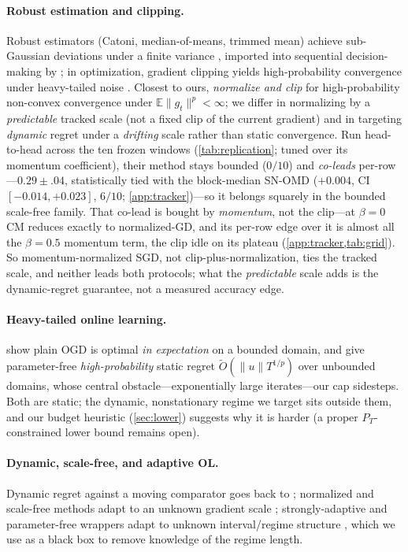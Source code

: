\documentclass{article}
\newcommand{\norm}[1]{\lVert #1 \rVert}
\newcommand{\gt}{g_t}
\begin{document}
\paragraph{Robust estimation and clipping.} Robust estimators (Catoni, median-of-means,
trimmed mean) achieve sub-Gaussian deviations under a finite variance
\citep{catoni2012,devroye2016,lugosi2019}, imported into sequential decision-making by
\citet{bubeck2013}; in optimization, gradient clipping yields high-probability convergence
under heavy-tailed noise \citep{zhang2020clip,gorbunov2020,nguyen2023}. Closest to ours,
\citet{cutkoskymehta2021} \emph{normalize and clip} for high-probability non-convex
convergence under $\mathbb{E}\norm{\gt}^p\!<\!\infty$; we differ in normalizing by a
\emph{predictable} tracked scale (not a fixed clip of the current gradient) and in targeting
\emph{dynamic} regret under a \emph{drifting} scale rather than static convergence. Run
head-to-head across the ten frozen windows (\cref{tab:replication}; tuned over its momentum
coefficient), their method stays bounded ($0/10$) and \emph{co-leads} per-row---$0.29\!\pm\!.04$,
statistically tied with the block-median SN-OMD ($+0.004$, CI $[-0.014,+0.023]$, $6/10$;
\cref{app:tracker})---so it belongs squarely in the bounded scale-free family. That co-lead is
bought by \emph{momentum}, not the clip---at $\beta{=}0$ CM reduces exactly to normalized-GD,
and its per-row edge over it is almost all the $\beta{=}0.5$ momentum term, the clip idle on its
plateau (\cref{app:tracker,tab:grid}). So momentum-normalized SGD, not clip-plus-normalization,
ties the tracked scale, and neither leads both protocols; what the \emph{predictable} scale adds
is the dynamic-regret guarantee, not a measured accuracy edge.

\paragraph{Heavy-tailed online learning.} \citet{liu2026oco} show plain OGD is optimal
\emph{in expectation} on a bounded domain, and \citet{zhangcutkosky2022} give parameter-free
\emph{high-probability} static regret $\tilde O(\norm u T^{1/p})$ over unbounded domains,
whose central obstacle---exponentially large iterates---our cap sidesteps. Both are static;
the dynamic, nonstationary regime we target sits outside them, and our budget heuristic
(\cref{sec:lower}) suggests why it is harder (a proper $P_T$-constrained lower bound remains
open).

\paragraph{Dynamic, scale-free, and adaptive OL.} Dynamic regret against a moving comparator
goes back to \citet{zinkevich2003}; normalized and scale-free methods adapt to an unknown
gradient scale \citep{levy2017,orabona2018}; strongly-adaptive and parameter-free wrappers adapt to unknown
interval/regime structure \citep{daniely2015,cutkosky2020}, which we use as a black box to
remove knowledge of the regime length.
\end{document}
